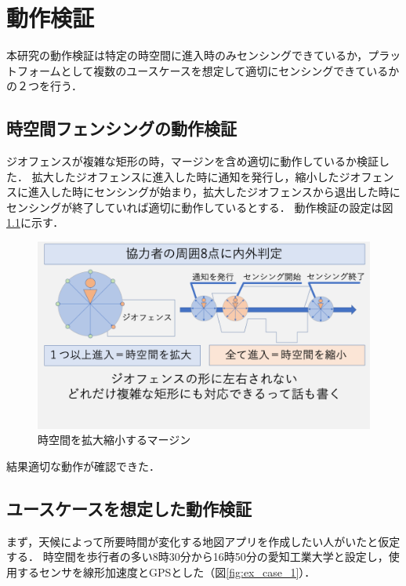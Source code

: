 \chapter{動作検証}
\thispagestyle{myheadings}
本研究の動作検証は特定の時空間に進入時のみセンシングできているか，プラットフォームとして複数のユースケースを想定して適切にセンシングできているかの２つを行う．

\section{時空間フェンシングの動作検証}
ジオフェンスが複雑な矩形の時，マージンを含め適切に動作しているか検証した．
拡大したジオフェンスに進入した時に通知を発行し，縮小したジオフェンスに進入した時にセンシングが始まり，拡大したジオフェンスから退出した時にセンシングが終了していれば適切に動作しているとする．
動作検証の設定は図\ref{fig:ex_margin_1}に示す．

\begin{figure}[tbh]
    \centering
    \includegraphics[width=16cm]{img_margin_2.png}
    \caption{時空間を拡大縮小するマージン}
    \label{fig:ex_margin_1}
\end{figure}

結果適切な動作が確認できた．

\section{ユースケースを想定した動作検証}
まず，天候によって所要時間が変化する地図アプリを作成したい人がいたと仮定する．
時空間を歩行者の多い8時30分から16時50分の愛知工業大学と設定し，使用するセンサを線形加速度とGPSとした（図\ref{fig:ex_case_1}）．


